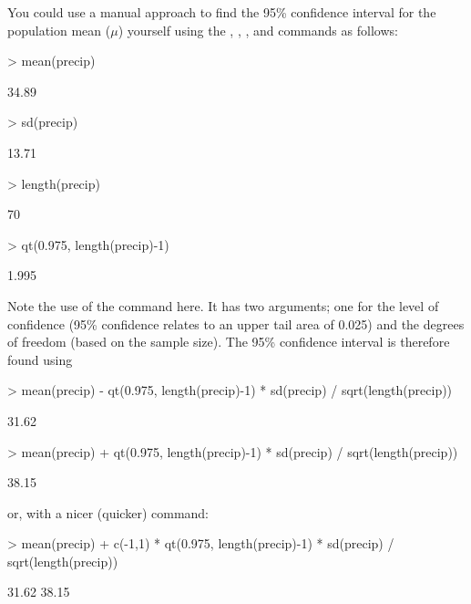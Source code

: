 You could use a manual approach to find the 95\% confidence interval for the population mean ($\mu$) yourself using the , , , and  commands as follows:  
\begin{Schunk}
\begin{Sinput}
> mean(precip) 
\end{Sinput}
\begin{Soutput}
[1] 34.89
\end{Soutput}
\begin{Sinput}
> sd(precip) 
\end{Sinput}
\begin{Soutput}
[1] 13.71
\end{Soutput}
\begin{Sinput}
> length(precip) 
\end{Sinput}
\begin{Soutput}
[1] 70
\end{Soutput}
\begin{Sinput}
> qt(0.975, length(precip)-1) 
\end{Sinput}
\begin{Soutput}
[1] 1.995
\end{Soutput}
\end{Schunk}
Note the use of the  command here. It has two arguments; one for the level of confidence (95\% confidence relates to an upper tail area of 0.025) and the degrees of freedom (based on the sample size). The 95\% confidence interval is therefore found using 
\begin{Schunk}
\begin{Sinput}
> mean(precip) - qt(0.975, length(precip)-1) * sd(precip) / sqrt(length(precip)) 
\end{Sinput}
\begin{Soutput}
[1] 31.62
\end{Soutput}
\begin{Sinput}
> mean(precip) + qt(0.975, length(precip)-1) * sd(precip) / sqrt(length(precip)) 
\end{Sinput}
\begin{Soutput}
[1] 38.15
\end{Soutput}
\end{Schunk}
or, with a nicer (quicker) command: 
\begin{Schunk}
\begin{Sinput}
> mean(precip) + c(-1,1) * qt(0.975, length(precip)-1) * sd(precip) / sqrt(length(precip)) 
\end{Sinput}
\begin{Soutput}
[1] 31.62 38.15
\end{Soutput}
\end{Schunk}
